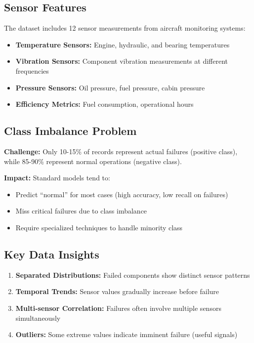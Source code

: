 \documentclass[11pt,a4paper]{article}
\begin{document}
\subsection{Sensor Features}
The dataset includes 12 sensor measurements from aircraft monitoring systems:

\begin{itemize}
    \item \textbf{Temperature Sensors:} Engine, hydraulic, and bearing temperatures
    \item \textbf{Vibration Sensors:} Component vibration measurements at different frequencies
    \item \textbf{Pressure Sensors:} Oil pressure, fuel pressure, cabin pressure
    \item \textbf{Efficiency Metrics:} Fuel consumption, operational hours
\end{itemize}

\subsection{Class Imbalance Problem}
\textbf{Challenge:} Only 10-15\% of records represent actual failures (positive class), while 85-90\% represent normal operations (negative class).

\textbf{Impact:} Standard models tend to:
\begin{itemize}
    \item Predict ``normal'' for most cases (high accuracy, low recall on failures)
    \item Miss critical failures due to class imbalance
    \item Require specialized techniques to handle minority class
\end{itemize}

\subsection{Key Data Insights}
\begin{enumerate}
    \item \textbf{Separated Distributions:} Failed components show distinct sensor patterns
    \item \textbf{Temporal Trends:} Sensor values gradually increase before failure
    \item \textbf{Multi-sensor Correlation:} Failures often involve multiple sensors simultaneously
    \item \textbf{Outliers:} Some extreme values indicate imminent failure (useful signals)
\end{enumerate}
\end{document}
